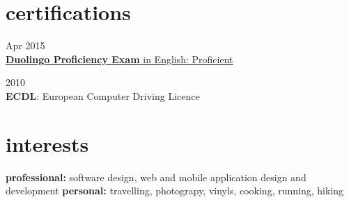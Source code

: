 \documentclass[]{friggeri-cv} %
\begin{document}

\section{certifications}

{Apr 2015} \\
{\href{https://certs.duolingo.com/ud85gf8c}{\textbf{Duolingo Proficiency Exam} in English: Proficient}}

{2010} \\
{\textbf{ECDL}: European Computer Driving Licence}



\section{interests}

\textbf{professional:} software design, web and mobile application design and development
\textbf{personal:} travelling, photograpy, vinyls, cooking, running, hiking
\end{document}
